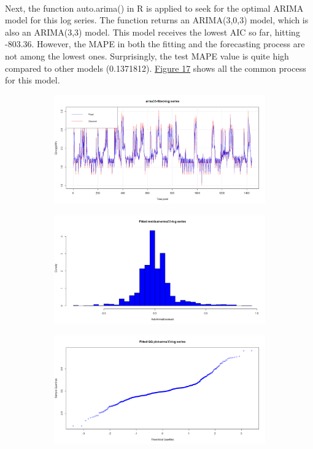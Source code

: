 \documentclass[12pt]{article}
\begin{document}
\paragraph{}
Next, the function auto.arima() in R is applied to seek for the optimal ARIMA model for this log series. The function returns an ARIMA(3,0,3) model, which is also an ARIMA(3,3) model. This model receives the lowest AIC so far, hitting -803.36. However, the MAPE in both the fitting and the forecasting process are not among the lowest ones. Surprisingly, the test MAPE value is quite high compared to other models (0.1371812). \href{figure17}{Figure 17} shows all the common process for this model.
\begin{figure}[H]
  \centering
  \begin{subfigure}[b]{0.49\linewidth}
    \includegraphics[width=\linewidth]{figure16-1.png}
  \end{subfigure}
  \begin{subfigure}[b]{0.49\linewidth}
    \includegraphics[width=\linewidth]{figure16-2.png}
  \end{subfigure}
  \begin{subfigure}[b]{0.49\linewidth}
    \includegraphics[width=\linewidth]{figure16-3.png}

\end{subfigure}
\end{figure}
\end{document}

